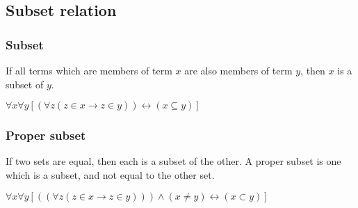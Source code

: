 
\subsection{Subset relation}

\subsubsection{Subset}

If all terms which are members of term \(x\) are also members of term \(y\), then \(x\) is a subset of \(y\).

\(\forall x\forall y[(\forall z(z\in x\rightarrow z\in y))\leftrightarrow (x\subseteq y)]\)

\subsubsection{Proper subset}

If two sets are equal, then each is a subset of the other. A proper subset is one which is a subset, and not equal to the other set.

\(\forall x\forall y[((\forall z(z\in x\rightarrow z\in y)))\land(x\ne y)\leftrightarrow (x\subset y)]\)

